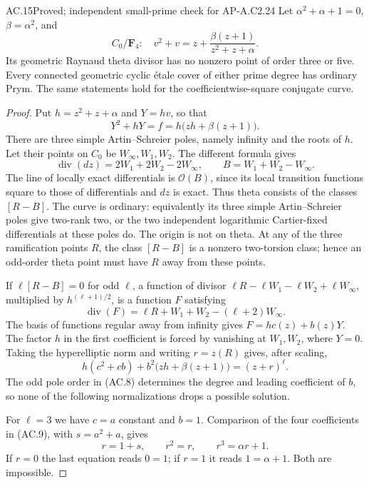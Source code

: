 \begin{claim}{AC.15}{Proved; independent small-prime check for AP-A.C2.24}
Let $\alpha^2+\alpha+1=0$, $\beta=\alpha^2$, and
\[
 C_0/\mathbf F_4:\quad v^2+v=z+\frac{\beta(z+1)}{z^2+z+\alpha}.
\]
Its geometric Raynaud theta divisor has no nonzero point of order three
or five.  Every connected geometric cyclic \'etale cover of either
prime degree has ordinary Prym.  The same statements hold for the
coefficientwise-square conjugate curve.
\end{claim}
\begin{proof}
Put $h=z^2+z+\alpha$ and $Y=hv$, so that
\[
             Y^2+hY=f=h\bigl(zh+\beta(z+1)\bigr).
\]
There are three simple Artin--Schreier poles, namely infinity and the
roots of $h$.  Let their points on $C_0$ be $W_\infty,W_1,W_2$.
The different formula gives
\[
     \operatorname{div}(dz)=2W_1+2W_2-2W_\infty,
     \qquad B=W_1+W_2-W_\infty.
\]
The line of locally exact differentials is $\mathcal O(B)$, since its
local transition functions square to those of differentials and $dz$
is exact.  Thus theta consists of the classes $[R-B]$.
The curve is ordinary: equivalently its three simple Artin--Schreier
poles give two-rank two, or the two independent logarithmic
Cartier-fixed differentials at these poles do.  The origin is not on
theta.  At any of the three ramification points $R$, the class $[R-B]$
is a nonzero two-torsion class; hence an odd-order theta point must have
$R$ away from these points.

If $\ell[R-B]=0$ for odd $\ell$, a function of divisor
$\ell R-\ell W_1-\ell W_2+\ell W_\infty$, multiplied by
$h^{(\ell+1)/2}$, is a function $F$ satisfying
\[
            \operatorname{div}(F)
                 =\ell R+W_1+W_2-(\ell+2)W_\infty.        \tag{AC.8}
\]
The basis of functions regular away from infinity gives
$F=h c(z)+b(z)Y$.  The factor $h$ in the first coefficient is forced by
vanishing at $W_1,W_2$, where $Y=0$.
Taking the hyperelliptic norm and writing $r=z(R)$ gives, after scaling,
\[
        h(c^2+cb)+b^2\bigl(zh+\beta(z+1)\bigr)
                          =(z+r)^\ell.                   \tag{AC.9}
\]
The odd pole order in (AC.8) determines the degree and leading coefficient
of $b$, so none of the following normalizations drops a possible solution.

For $\ell=3$ we have $c=a$ constant and $b=1$.
Comparison of the four coefficients in (AC.9), with $s=a^2+a$, gives
\[
      r=1+s,\qquad r^2=r,\qquad r^3=\alpha r+1.
\]
If $r=0$ the last equation reads $0=1$; if $r=1$ it reads
$1=\alpha+1$.  Both are impossible.


\end{proof}
